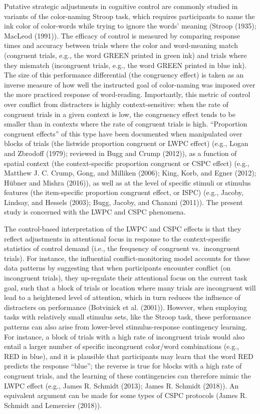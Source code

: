 \documentclass[
  ,man,floatsintext]{apa6}
\begin{document}
Putative strategic adjustments in cognitive control are commonly studied in variants of the color-naming Stroop task, which requires participants to name the ink color of color-words while trying to ignore the words' meaning (Stroop (1935); MacLeod (1991)). The efficacy of control is measured by comparing response times and accuracy between trials where the color and word-meaning match (congruent trials, e.g., the word GREEN printed in green ink) and trials where they mismatch (incongruent trials, e.g., the word GREEN printed in blue ink). The size of this performance differential (the congruency effect) is taken as an inverse measure of how well the instructed goal of color-naming was imposed over the more practiced response of word-reading. Importantly, this metric of control over conflict from distracters is highly context-sensitive: when the rate of congruent trials in a given context is low, the congruency effect tends to be smaller than in contexts where the rate of congruent trials is high. ``Proportion congruent effects'' of this type have been documented when manipulated over blocks of trials (the listwide proportion congruent or LWPC effect) (e.g., Logan and Zbrodoff (1979); reviewed in Bugg and Crump (2012)), as a function of spatial context (the context-specific proportion congruent or CSPC effect) (e.g., Matthew J. C. Crump, Gong, and Milliken (2006); King, Korb, and Egner (2012); Hübner and Mishra (2016)), as well as at the level of specific stimuli or stimulus features (the item-specific proportion congruent effect, or ISPC) (e.g., Jacoby, Lindsay, and Hessels (2003); Bugg, Jacoby, and Chanani (2011)). The present study is concerned with the LWPC and CSPC phenomena.

The control-based interpretation of the LWPC and CSPC effects is that they reflect adjustments in attentional focus in response to the context-specific statistics of control demand (i.e., the frequency of congruent vs.~incongruent trials). For instance, the influential conflict-monitoring model accounts for these data patterns by suggesting that when participants encounter conflict (on incongruent trials), they up-regulate their attentional focus on the current task goal, such that a block of trials or location where many trials are incongruent will lead to a heightened level of attention, which in turn reduces the influence of distracters on performance (Botvinick et al. (2001)). However, when employing tasks with relatively small stimulus sets, like the Stroop task, these performance patterns can also arise from lower-level stimulus-response contingency learning. For instance, a block of trials with a high rate of incongruent trials would also entail a larger number of specific incongruent color/word combinations (e.g., RED in blue), and it is plausible that participants may learn that the word RED predicts the response ``blue''; the reverse is true for blocks with a high rate of congruent trials, and the learning of these contingencies can therefore mimic the LWPC effect (e.g., James R. Schmidt (2013); James R. Schmidt (2018)). An equivalent argument can be made for some types of CSPC protocols (James R. Schmidt and Lemercier (2018)).
\end{document}
